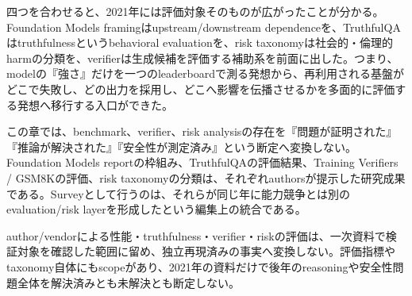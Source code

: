 四つを合わせると、2021年には評価対象そのものが広がったことが分かる。Foundation Models framingはupstream/downstream dependenceを、TruthfulQAはtruthfulnessというbehavioral evaluationを、risk taxonomyは社会的・倫理的harmの分類を、verifierは生成候補を評価する補助系を前面に出した。つまり、modelの『強さ』だけを一つのleaderboardで測る発想から、再利用される基盤がどこで失敗し、どの出力を採用し、どこへ影響を伝播させるかを多面的に評価する発想へ移行する入口ができた。\autocite{src-20fd9bba2e7a,src-34f845c1e710,src-750bc3eeb1bc,src-8536f9ceae6d,src-c16f4ae139bf,src-d9549fe4ff37}


この章では、benchmark、verifier、risk analysisの存在を『問題が証明された』『推論が解決された』『安全性が測定済み』という断定へ変換しない。Foundation Models reportの枠組み、TruthfulQAの評価結果、Training Verifiers / GSM8Kの評価、risk taxonomyの分類は、それぞれauthorsが提示した研究成果である。Surveyとして行うのは、それらが同じ年に能力競争とは別のevaluation/risk layerを形成したという編集上の統合である。\autocite{src-20fd9bba2e7a,src-34f845c1e710,src-750bc3eeb1bc,src-8536f9ceae6d,src-c16f4ae139bf,src-d9549fe4ff37}


\begin{claimboundary}
author/vendorによる性能・truthfulness・verifier・riskの評価は、一次資料で検証対象を確認した範囲に留め、独立再現済みの事実へ変換しない。評価指標やtaxonomy自体にもscopeがあり、2021年の資料だけで後年のreasoningや安全性問題全体を解決済みとも未解決とも断定しない。\autocite{src-20fd9bba2e7a,src-34f845c1e710,src-750bc3eeb1bc,src-8536f9ceae6d,src-c16f4ae139bf,src-d9549fe4ff37}
\end{claimboundary}
